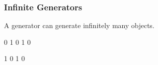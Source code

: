 \begin{comment}
<<Generator>>=
g1: Generator I := generate {yield 4; yield 2}
g2: Generator I := generate {for i in g1 repeat {
    yield i; yield 0
}}
for i in g2 repeat stdout << i << space
map(f: I -> List I, g: Generator I): Generator List I == {
  f i for i in g
}
f1(n: I): List I == [n]
f2(n: I): List I == [0 for i in 1..n]
ll: List List I := [map(f1, g1)]
[map(f1, generator l)]
[map(f2, generator a)]
@
\end{comment}



















\begin{frame}[fragile]
  \frametitle<presentation>{Infinite Generators}

A generator can generate infinitely many objects.
\begin{myverbatim}

0 1 0 1 0

1 0 1 0
\end{myverbatim}
\end{frame}
\begin{comment}
<<Generator>>=
g1 := generate repeat {yield 0; yield 1}
for k in 1..5 for i in g1 repeat stdout << i << space
for k in l    for i in g1 repeat stdout << i << space
#quit
@
\end{comment}































